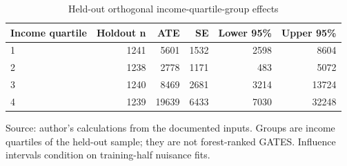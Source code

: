 \begin{table}[htbp]
\centering
\small
\caption{Held-out orthogonal income-quartile-group effects}
\begin{tabularx}{\linewidth}{Xrrrrr}
\toprule
Income quartile & Holdout n & ATE & SE & Lower 95\% & Upper 95\% \\
\midrule
1 & 1241 & 5601 & 1532 & 2598 & 8604 \\
2 & 1238 & 2778 & 1171 & 483 & 5072 \\
3 & 1240 & 8469 & 2681 & 3214 & 13724 \\
4 & 1239 & 19639 & 6433 & 7030 & 32248 \\
\bottomrule
\end{tabularx}
\par\vspace{3pt}\begin{minipage}{\linewidth}\footnotesize Source: author's calculations from the documented inputs.\allowbreak{} Groups are income quartiles of the held-out sample; they are not forest-ranked GATES.\allowbreak{} Influence intervals condition on training-half nuisance fits.\allowbreak{}\end{minipage}
\end{table}
